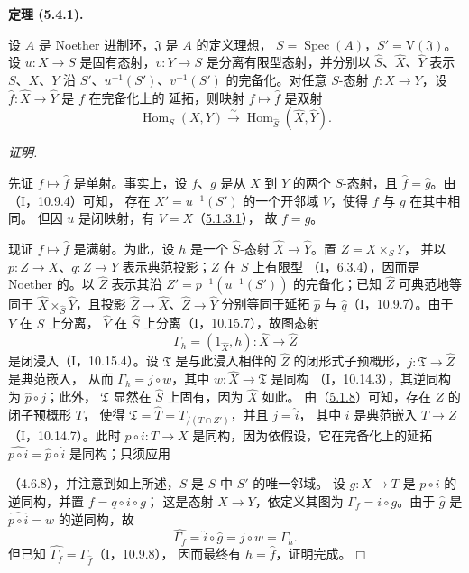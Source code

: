 \documentclass[UTF8,fontset=none,11pt,oneside,openany]{ctexbook}
\providecommand{\square}{\mdlgwhtsquare}
\newenvironment{theorem}[1][]{%
  \par\medskip\noindent\textbf{定理 (#1).}\ %
}{\par}
\newenvironment{proof}{%
  \par\smallskip\noindent\textit{证明.}\ %
}{\hfill$\square$\par}
\newcommand{\oldpage}[2][]{%
  \hypertarget{ega-source-page-#1-#2}{}%
  \marginnote{\scriptsize\textbf{#1}~|~#2}\ignorespaces}
\let\EGAOriginalLabel\label
\renewcommand{\label}[1]{\phantomsection\EGAOriginalLabel{#1}}
\begin{document}
\begin{theorem}[5.4.1]
\label{III.5.4.1-fr}
设 $A$ 是 Noether 进制环，$\mathfrak J$ 是 $A$ 的定义理想，
$S=\operatorname{Spec}(A)$，$S'=\mathrm V(\mathfrak J)$。设
$u:X\to S$ 是固有态射，$v:Y\to S$ 是分离有限型态射，并分别以
$\widehat S$、$\widehat X$、$\widehat Y$ 表示 $S$、$X$、$Y$ 沿
$S'$、$u^{-1}(S')$、$v^{-1}(S')$ 的完备化。对任意 $S$-态射
$f:X\to Y$，设 $\widehat f:\widehat X\to\widehat Y$ 是 $f$ 在完备化上的
延拓，则映射 $f\mapsto\widehat f$ 是双射
\[
\operatorname{Hom}_S(X,Y)\xrightarrow{\ \sim\ }
\operatorname{Hom}_{\widehat S}(\widehat X,\widehat Y).
\]
\end{theorem}

\begin{proof}
先证 $f\mapsto\widehat f$ 是单射。事实上，设 $f$、$g$ 是从 $X$ 到 $Y$
的两个 $S$-态射，且 $\widehat f=\widehat g$。由（I，10.9.4）可知，
存在 $X'=u^{-1}(S')$ 的一个开邻域 $V$，使得 $f$ 与 $g$ 在其中相同。
但因 $u$ 是闭映射，有 $V=X$（\hyperref[III.5.1.3.1-fr]{5.1.3.1}），
故 $f=g$。

现证 $f\mapsto\widehat f$ 是满射。为此，设 $h$ 是一个
$\widehat S$-态射 $\widehat X\to\widehat Y$。置 $Z=X\times_S Y$，
并以 $p:Z\to X$、$q:Z\to Y$ 表示典范投影；$Z$ 在 $S$ 上有限型
（I，6.3.4），因而是 Noether 的。以 $\widehat Z$ 表示其沿
$Z'=p^{-1}(u^{-1}(S'))$ 的完备化；已知 $\widehat Z$ 可典范地等同于
$\widehat X\times_{\widehat S}\widehat Y$，且投影
$\widehat Z\to\widehat X$、$\widehat Z\to\widehat Y$ 分别等同于延拓
$\widehat p$ 与 $\widehat q$（I，10.9.7）。由于 $Y$ 在 $S$ 上分离，
$\widehat Y$ 在 $\widehat S$ 上分离（I，10.15.7），故图态射
\[
\Gamma_h=(1_{\widehat X},h):\widehat X\to\widehat Z
\]
是闭浸入（I，10.15.4）。设 $\mathfrak T$ 是与此浸入相伴的
$\widehat Z$ 的闭形式子预概形，$j:\mathfrak T\to\widehat Z$ 是典范嵌入，
从而 $\Gamma_h=j\circ w$，其中 $w:\widehat X\to\mathfrak T$ 是同构
（I，10.14.3），其逆同构为 $\widehat p\circ j$；此外，
$\mathfrak T$ 显然在 $\widehat S$ 上固有，因为 $\widehat X$ 如此。
由（\hyperref[III.5.1.8-fr]{5.1.8}）可知，存在 $Z$ 的闭子预概形 $T$，
使得 $\mathfrak T=\widehat T=T_{/(T\cap Z')}$，并且 $j=\widehat i$，
其中 $i$ 是典范嵌入 $T\to Z$（I，10.14.7）。此时
$p\circ i:T\to X$ 是同构，因为依假设，它在完备化上的延拓
$\widehat{p\circ i}=\widehat p\circ\widehat i$ 是同构；只须应用

\oldpage[III]{157}

（4.6.8），并注意到如上所述，$S$ 是 $S$ 中 $S'$ 的唯一邻域。
设 $g:X\to T$ 是 $p\circ i$ 的逆同构，并置 $f=q\circ i\circ g$；
这是态射 $X\to Y$，依定义其图为 $\Gamma_f=i\circ g$。由于
$\widehat g$ 是 $\widehat{p\circ i}=w$ 的逆同构，故
\[
\widehat{\Gamma_f}=\widehat i\circ\widehat g=j\circ w=\Gamma_h.
\]
但已知 $\widehat{\Gamma_f}=\Gamma_{\widehat f}$（I，10.9.8），
因而最终有 $h=\widehat f$，证明完成。
\end{proof}
\end{document}
